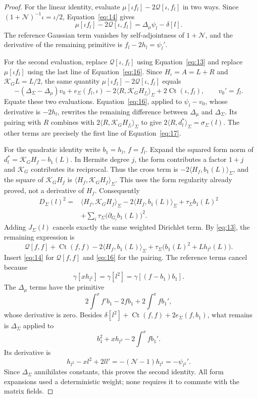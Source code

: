 \begin{proof}
For the linear identity, evaluate
\(\mu[\iota f_l]-2\mathcal Q[\iota,f_l]\) in two ways.
Since \((1+\mathcal N)^{-1}\iota=\iota/2\), Equation~\eqref{eq:14}
gives
\[
 \mu[\iota f_l]-2\mathcal Q[\iota,f_l]
    =\Delta_\mu\psi_l-\delta[l].
\]
The reference Gaussian term vanishes by self-adjointness of
\(1+\mathcal N\), and the derivative of the remaining primitive is
\(f_l-2h_l=\psi_l'\).

For the second evaluation, replace \(\mathcal Q[\iota,f_l]\) using
Equation~\eqref{eq:13} and replace \(\mu[\iota f_l]\) using the
last line of Equation~\eqref{eq:16}. Since \(H_\iota=A=L+R\)
and \(\mathcal K_GL=L/2\), the same quantity
\(\mu[\iota f_l]-2\mathcal Q[\iota,f_l]\) equals
\[
 -(\Delta_\Sigma-\Delta_\mu)v_0+e_\Sigma(f_l,\iota)
   -2\langle R,\mathcal K_GH_{f_l}\rangle_\Sigma
   +2\operatorname{Ct}(\iota,f_l),\qquad v_0'=f_l.
\]
Equate these two evaluations. Equation~\eqref{eq:16}, applied to
\(\psi_l-v_0\), whose derivative is \(-2h_l\), rewrites the remaining
difference between \(\Delta_\mu\) and \(\Delta_\Sigma\).
Its pairing with \(R\) combines with
\(2\langle R,\mathcal K_GH_{f_l}\rangle_\Sigma\) to give
\(2\langle R,d_l^*\rangle_\Sigma=\sigma_\Sigma(l)\).
The other terms are precisely the first line of Equation~\eqref{eq:17}.

For the quadratic identity write \(b_1=h_l\), \(f=f_l\).
Expand the squared form norm of
\(d_l^*=\mathcal K_GH_f-b_1(L)\).
In Hermite degree \(j\), the form contributes a factor \(1+j\)
and \(\mathcal K_G\) contributes its reciprocal. Thus the cross term
is \(-2\langle H_f,b_1(L)\rangle_\Sigma\), and the square of
\(\mathcal K_GH_f\) is
\(\langle H_f,\mathcal K_GH_f\rangle_\Sigma\). This uses the form
regularity already proved, not a derivative of \(H_f\). Consequently
\[
 \begin{split}
 D_\Sigma(l)^2
  ={}&\langle H_f,\mathcal K_GH_f\rangle_\Sigma
       -2\langle H_f,b_1(L)\rangle_\Sigma
       +\tau_\Sigma b_1(L)^2\\
     &+\sum_i\tau_\Sigma
                    \bigl(\partial_{G_i}b_1(L)\bigr)^2 .
 \end{split}
\]
Adding \(J_\Sigma(l)\) cancels exactly the same weighted Dirichlet
term. By \eqref{eq:13}, the remaining expression is
\[
 \mathcal Q[f,f]+\operatorname{Ct}(f,f)
   -2\langle H_f,b_1(L)\rangle_\Sigma
   +\tau_\Sigma\bigl(b_1(L)^2+Lh_{l^2}(L)\bigr).
\]
Insert \eqref{eq:14} for \(\mathcal Q[f,f]\) and
\eqref{eq:16} for the pairing. The reference terms cancel because
\[
 \gamma[xh_{l^2}]=\gamma[l^2]
    =\gamma[(f-b_1)b_1].
\]
The \(\Delta_\mu\) terms have the primitive
\[
 2\int^x f'b_1-2fb_1+2\int^x fb_1',
\]
whose derivative is zero. Besides
\(\delta[l^2]+\operatorname{Ct}(f,f)+2e_\Sigma(f,b_1)\),
what remains is \(\Delta_\Sigma\) applied to
\[
 b_1^2+xh_{l^2}-2\int^x fb_1'.
\]
Its derivative is
\[
 h_{l^2}-x l^2+2ll'
    =-(\mathcal N-1)h_{l^2}=-\psi_{l^2}'.
\]
Since \(\Delta_\Sigma\) annihilates constants, this proves the second
identity. All form expansions used a deterministic weight; none
requires it to commute with the matrix fields.
\end{proof}

